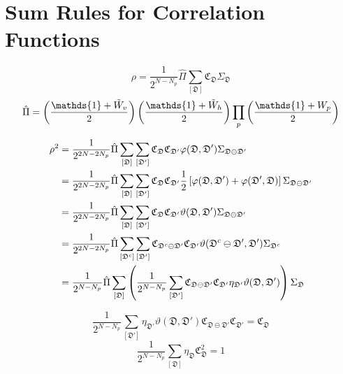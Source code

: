\section{Sum Rules for Correlation Functions}

\[
\rho 
= 
\frac{1}{2^{N-N_p}}
\hat{\Pi}
\sum_{[\mathfrak{D}]}
\mathfrak{C}_{\mathfrak{D}}
\Sigma_{\mathfrak{D}}
\]
\[
\hat{\Pi}
=
\lr{\frac{\mathds{1} + \tilde{W}_v}{2}}
\lr{\frac{\mathds{1} + \tilde{W}_h}{2}}
\prod_{p}\lr{\frac{\mathds{1} + W_p}{2}}
\]

\begin{align*}
    \rho^2 
    &= 
    \frac{1}{2^{2N-2N_p}}
    \hat{\Pi}
    \sum_{[\mathfrak{D}]}\sum_{[\mathfrak{D}']}
    \mathfrak{C}_{\mathfrak{D}}
    \mathfrak{C}_{\mathfrak{D}'}
    \varphi(\mathfrak{D},\mathfrak{D}')
    \Sigma_{\mathfrak{D}\ominus\mathfrak{D}'}\\
    &=
    \frac{1}{2^{2N-2N_p}}
    \hat{\Pi}
    \sum_{[\mathfrak{D}]}\sum_{[\mathfrak{D}']}
    \mathfrak{C}_{\mathfrak{D}}
    \mathfrak{C}_{\mathfrak{D}'}
    \frac{1}{2}
    \left[ 
    \varphi(\mathfrak{D},\mathfrak{D}')
    +
    \varphi(\mathfrak{D}',\mathfrak{D})
     \right]
    \Sigma_{\mathfrak{D}\ominus\mathfrak{D}'} \\
    &=
    \frac{1}{2^{2N-2N_p}}
    \hat{\Pi}
    \sum_{[\mathfrak{D}]}\sum_{[\mathfrak{D}']}
    \mathfrak{C}_{\mathfrak{D}}
    \mathfrak{C}_{\mathfrak{D}'}
    \vartheta(\mathfrak{D},\mathfrak{D}')
    \Sigma_{\mathfrak{D}\ominus\mathfrak{D}'} \\
    &= 
    \frac{1}{2^{2N-2N_p}}
    \hat{\Pi}
    \sum_{[\mathfrak{D}^c]}\sum_{[\mathfrak{D}']}
    \mathfrak{C}_{\mathfrak{D}^c\ominus\mathfrak{D}'}
    \mathfrak{C}_{\mathfrak{D}'}
    \vartheta(\mathfrak{D}^c\ominus\mathfrak{D}',\mathfrak{D}')
    \Sigma_{\mathfrak{D}^c} \\
    &=
    \frac{1}{2^{N-N_p}}
    \hat{\Pi}
    \sum_{[\mathfrak{D}]}
    \left( 
        \frac{1}{2^{N-N_p}}
        \sum_{[\mathfrak{D}']}
        \mathfrak{C}_{\mathfrak{D}\ominus\mathfrak{D}'}
        \mathfrak{C}_{\mathfrak{D}'}
        \eta_{\mathfrak{D}'}
        \vartheta(\mathfrak{D},\mathfrak{D}')
     \right)
    \Sigma_{\mathfrak{D}}
\end{align*}

\begin{equation}\label{eq:strong-condition}
    \frac{1}{2^{N-N_p}}
    \sum_{[\mathfrak{D}']}
    \eta_{\mathfrak{D}'} \vartheta(\mathfrak{D},\mathfrak{D}')
    \mathfrak{C}_{\mathfrak{D}\ominus\mathfrak{D}'}
    \mathfrak{C}_{\mathfrak{D}'}
    =
    \mathfrak{C}_{\mathfrak{D}}
\end{equation}
\begin{equation}\label{eq:weak-condition}
    \frac{1}{2^{N-N_p}}
    \sum_{[\mathfrak{D}]}
    \eta_\mathfrak{D}
    \mathfrak{C}_{\mathfrak{D}}^2
    =
    1
\end{equation}

